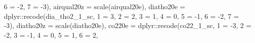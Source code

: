 \documentclass[
]{article}
\newenvironment{Shaded}{\begin{snugshade}}{\end{snugshade}}
\newcommand{\AttributeTok}[1]{\textcolor[rgb]{0.77,0.63,0.00}{#1}}
\newcommand{\DecValTok}[1]{\textcolor[rgb]{0.00,0.00,0.81}{#1}}
\newcommand{\FunctionTok}[1]{\textcolor[rgb]{0.00,0.00,0.00}{#1}}
\newcommand{\NormalTok}[1]{#1}
\newcommand{\OtherTok}[1]{\textcolor[rgb]{0.56,0.35,0.01}{#1}}
\newcommand{\SpecialCharTok}[1]{\textcolor[rgb]{0.00,0.00,0.00}{#1}}
\newcommand{\StringTok}[1]{\textcolor[rgb]{0.31,0.60,0.02}{#1}}
\begin{document}
\begin{Shaded}
\begin{Highlighting}[]
                           \StringTok{\textasciigrave{}}\AttributeTok{6}\StringTok{\textasciigrave{}} \OtherTok{=} \SpecialCharTok{{-}}\DecValTok{2}\NormalTok{,}
                           \StringTok{\textasciigrave{}}\AttributeTok{7}\StringTok{\textasciigrave{}} \OtherTok{=} \SpecialCharTok{{-}}\DecValTok{3}\NormalTok{),}
         \AttributeTok{airqual20z =} \FunctionTok{scale}\NormalTok{(airqual20e),}
         \AttributeTok{diatho20e =}\NormalTok{ dplyr}\SpecialCharTok{::}\FunctionTok{recode}\NormalTok{(dia\_tho2\_1\_sc, }\StringTok{\textasciigrave{}}\AttributeTok{1}\StringTok{\textasciigrave{}} \OtherTok{=} \DecValTok{3}\NormalTok{,}
                           \StringTok{\textasciigrave{}}\AttributeTok{2}\StringTok{\textasciigrave{}} \OtherTok{=} \DecValTok{2}\NormalTok{,}
                           \StringTok{\textasciigrave{}}\AttributeTok{3}\StringTok{\textasciigrave{}} \OtherTok{=} \DecValTok{1}\NormalTok{,}
                           \StringTok{\textasciigrave{}}\AttributeTok{4}\StringTok{\textasciigrave{}} \OtherTok{=} \DecValTok{0}\NormalTok{,}
                           \StringTok{\textasciigrave{}}\AttributeTok{5}\StringTok{\textasciigrave{}} \OtherTok{=} \SpecialCharTok{{-}}\DecValTok{1}\NormalTok{,}
                           \StringTok{\textasciigrave{}}\AttributeTok{6}\StringTok{\textasciigrave{}} \OtherTok{=} \SpecialCharTok{{-}}\DecValTok{2}\NormalTok{,}
                           \StringTok{\textasciigrave{}}\AttributeTok{7}\StringTok{\textasciigrave{}} \OtherTok{=} \SpecialCharTok{{-}}\DecValTok{3}\NormalTok{),}
         \AttributeTok{diatho20z =} \FunctionTok{scale}\NormalTok{(diatho20e),}
         \AttributeTok{co220e =}\NormalTok{ dplyr}\SpecialCharTok{::}\FunctionTok{recode}\NormalTok{(co22\_1\_sc, }\StringTok{\textasciigrave{}}\AttributeTok{1}\StringTok{\textasciigrave{}} \OtherTok{=} \SpecialCharTok{{-}}\DecValTok{3}\NormalTok{,}
                           \StringTok{\textasciigrave{}}\AttributeTok{2}\StringTok{\textasciigrave{}} \OtherTok{=} \SpecialCharTok{{-}}\DecValTok{2}\NormalTok{,}
                           \StringTok{\textasciigrave{}}\AttributeTok{3}\StringTok{\textasciigrave{}} \OtherTok{=} \SpecialCharTok{{-}}\DecValTok{1}\NormalTok{,}
                           \StringTok{\textasciigrave{}}\AttributeTok{4}\StringTok{\textasciigrave{}} \OtherTok{=} \DecValTok{0}\NormalTok{,}
                           \StringTok{\textasciigrave{}}\AttributeTok{5}\StringTok{\textasciigrave{}} \OtherTok{=} \DecValTok{1}\NormalTok{,}
                           \StringTok{\textasciigrave{}}\AttributeTok{6}\StringTok{\textasciigrave{}} \OtherTok{=} \DecValTok{2}\NormalTok{,}

\end{Highlighting}
\end{Shaded}
\end{document}
